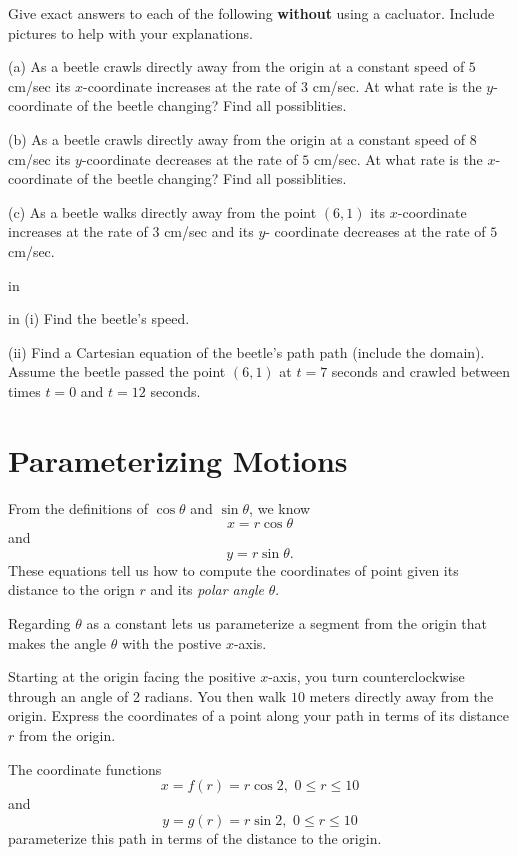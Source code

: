 \documentclass{ximera}
\newcommand{\pskip}{\vskip 0.1 in}
\begin{document}
\begin{question} \label{Qet433:Cosine}
Give exact answers to each of the following {\bf without} using a cacluator. Include pictures to help with your explanations.

(a) As a beetle crawls directly away from the origin at a constant speed of $5$ cm/sec its $x$-coordinate increases at the rate of $3$ cm/sec. At what rate is the $y$-coordinate of the beetle changing? Find all possiblities. 

(b) As a beetle crawls directly away from the origin at a constant speed of $8$ cm/sec its $y$-coordinate decreases at the rate of $5$ cm/sec. At what rate is the $x$-coordinate of the beetle changing? Find all possiblities. 

(c) As a beetle walks directly away from the point $(6,1)$ its $x$-coordinate increases at the rate of $3$ cm/sec and its $y$-
coordinate decreases at the rate of $5$ cm/sec. 

\pskip

 in (i) Find the beetle's speed. 

(ii) Find a Cartesian equation of the beetle's path path (include the domain). Assume the beetle passed the point $(6,1)$ at $t=7$ seconds and crawled between times $t=0$ and $t=12$ seconds. 


\end{question}




\section{Parameterizing Motions}
From the definitions of $\cos\theta$ and $\sin \theta$, we know
\[
    x = r \cos \theta 
\]
and
\[
      y=r\sin \theta .
\]
These equations tell us how to compute the coordinates of point given its distance to the orign $r$ and its \emph{polar angle} $\theta$.

Regarding $\theta$ as a constant lets us parameterize a segment from the origin that makes the angle $\theta$ with the postive $x$-axis.

\begin{example} \label{Ex11:Cosine}
Starting at the origin facing the positive $x$-axis, you turn counterclockwise through an angle of 2 radians. You then walk $10$ meters directly away from the origin. Express the coordinates of a point along your path in terms of its distance $r$ from the origin.

\begin{explanation}
The coordinate functions
\[
     x = f(r) = r\cos 2  , \,\,   0\leq r \leq 10
\]
and
\[
  y =g(r) = r \sin 2  , \,\,   0\leq r \leq 10
\]
parameterize this path in terms of the distance to the origin.
\end{explanation}
\end{example}
\end{document}
